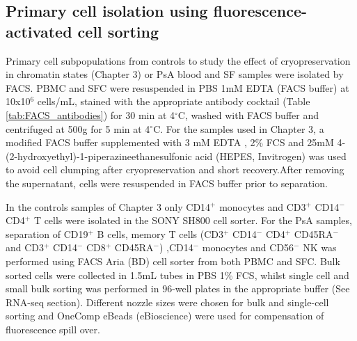 \subsection{Primary cell isolation using fluorescence-activated cell sorting}
Primary cell subpopulations from controls to study the effect of cryopreservation in chromatin states (Chapter 3) or PsA blood and SF samples were isolated by FACS. PBMC and SFC were resuspended in PBS 1mM EDTA (FACS buffer) at 10x10$^6$ cells/mL, stained with the appropriate antibody cocktail (Table \ref{tab:FACS_antibodies}) for 30 min at 4{$^\circ$}C, washed with FACS buffer and centrifuged at 500g for 5 min at 4{$^\circ$}C. For the samples used in Chapter 3, a modified FACS buffer supplemented with 3 mM EDTA , 2\% FCS and 25mM 4-(2-hydroxyethyl)-1-piperazineethanesulfonic acid (HEPES, Invitrogen) was used to avoid cell clumping after cryopreservation and short recovery.After removing the supernatant, cells were resuspended in FACS buffer prior to separation. 

In the controls samples of Chapter 3 only CD14$^{+}$ monocytes and CD3$^+$ CD14$^{-}$ CD4$^{+}$ T cells were isolated in the SONY SH800 cell sorter. For the PsA samples, separation of  CD19$^{+}$ B cells, memory T cells (CD3$^{+}$ CD14$^{-}$ CD4$^{+}$ CD45RA$^{-}$ and CD3$^{+}$ CD14$^{-}$ CD8$^{+}$ CD45RA$^{-}$) ,CD14$^{-}$ monocytes and CD56$^{-}$ NK was performed using FACS Aria (BD) cell sorter from both PBMC and SFC. Bulk sorted cells were collected in 1.5mL tubes in PBS 1\% FCS, whilst single cell and small bulk sorting was performed in 96-well plates in the appropriate buffer (See RNA-seq section). Different nozzle sizes were chosen for bulk and single-cell sorting and OneComp eBeads (eBioscience) were used for compensation of fluorescence spill over.


